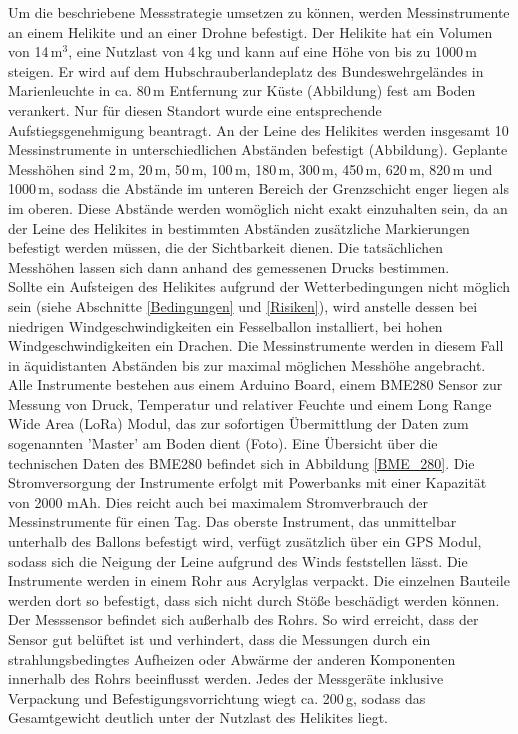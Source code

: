 \documentclass[a4paper,11pt,DIV=calc,tablecaptionabove,headinclude,twoside]{article}
\begin{document}
Um die beschriebene Messstrategie umsetzen zu können, werden Messinstrumente an einem Helikite und an einer Drohne befestigt. 
Der Helikite hat ein Volumen von 14\,$\text{m}^{3}$, eine Nutzlast von 4\,kg und kann auf eine Höhe von bis zu 1000\,m steigen. Er wird auf dem Hubschrauberlandeplatz des Bundeswehrgeländes in Marienleuchte in ca. 80\,m Entfernung zur Küste (Abbildung) fest am Boden verankert. Nur für diesen Standort wurde eine entsprechende Aufstiegsgenehmigung beantragt. An der Leine des Helikites werden insgesamt 10 Messinstrumente in unterschiedlichen Abständen befestigt (Abbildung). Geplante Messhöhen sind 2\,m, 20\,m, 50\,m, 100\,m, 180\,m, 300\,m, 450\,m, 620\,m, 820\,m und 1000\,m, sodass die Abstände im unteren Bereich der Grenzschicht enger liegen als im oberen. Diese Abstände werden womöglich nicht exakt einzuhalten sein, da an der Leine des Helikites in bestimmten Abständen zusätzliche Markierungen befestigt werden müssen, die der Sichtbarkeit dienen. Die tatsächlichen Messhöhen lassen sich dann anhand des gemessenen Drucks bestimmen. \\

Sollte ein Aufsteigen des Helikites aufgrund der Wetterbedingungen nicht möglich sein (siehe Abschnitte \ref{Bedingungen} und \ref{Risiken}), wird anstelle dessen bei niedrigen Windgeschwindigkeiten ein Fesselballon installiert, bei hohen Windgeschwindigkeiten ein Drachen. Die Messinstrumente werden in diesem Fall in äquidistanten Abständen bis zur maximal möglichen Messhöhe angebracht. \\
  
Alle Instrumente bestehen aus einem Arduino Board, einem BME280 Sensor zur Messung von Druck, Temperatur und relativer Feuchte und einem Long Range Wide Area (LoRa) Modul, das zur sofortigen Übermittlung der Daten zum sogenannten 'Master' am Boden dient (Foto). Eine Übersicht über die technischen Daten des BME280 befindet sich in Abbildung \ref{BME_280}. Die Stromversorgung der Instrumente erfolgt mit Powerbanks mit einer Kapazität von 2000 mAh. Dies reicht auch bei maximalem Stromverbrauch der Messinstrumente für einen Tag. Das oberste Instrument, das unmittelbar unterhalb des Ballons befestigt wird, verfügt zusätzlich über ein GPS Modul, sodass sich die Neigung der Leine aufgrund des Winds feststellen lässt. Die Instrumente werden in einem Rohr aus Acrylglas verpackt. Die einzelnen Bauteile werden dort so befestigt, dass sich nicht durch Stöße beschädigt werden können. Der Messsensor befindet sich außerhalb des Rohrs. So wird erreicht, dass der Sensor gut belüftet ist und verhindert, dass die Messungen durch ein strahlungsbedingtes Aufheizen oder Abwärme der anderen Komponenten innerhalb des Rohrs beeinflusst werden.  
Jedes der Messgeräte inklusive Verpackung und Befestigungsvorrichtung wiegt ca. 200\,g, sodass das Gesamtgewicht deutlich unter der Nutzlast des Helikites liegt.\\
   
\end{document}
